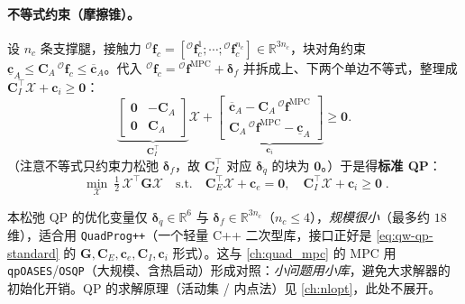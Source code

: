\paragraph{不等式约束（摩擦锥）。}
设 $n_c$ 条支撑腿，接触力 ${}^{\mathcal{O}}\boldsymbol{f}_c=[{}^{\mathcal{O}}\boldsymbol{f}_c^1;\cdots;{}^{\mathcal{O}}\boldsymbol{f}_c^{n_c}]\in\mathbb{R}^{3n_c}$，块对角约束 $\underline{\boldsymbol{c}}_A\le\boldsymbol{C}_A\,{}^{\mathcal{O}}\boldsymbol{f}_c\le\overline{\boldsymbol{c}}_A$。代入 ${}^{\mathcal{O}}\boldsymbol{f}_c={}^{\mathcal{O}}\boldsymbol{f}^{\mathrm{MPC}}+\boldsymbol{\delta}_f$ 并拆成上、下两个单边不等式，整理成 $\boldsymbol{C}_I^\top\boldsymbol{\mathcal{X}}+\boldsymbol{c}_i\ge\mathbf{0}$\cite{yu2021quadruped}：
\begin{equation}
  \underbrace{\begin{bmatrix}\mathbf{0}&-\boldsymbol{C}_A\\\mathbf{0}&\boldsymbol{C}_A\end{bmatrix}}_{\boldsymbol{C}_I^\top}\boldsymbol{\mathcal{X}}
  +\underbrace{\begin{bmatrix}\overline{\boldsymbol{c}}_A-\boldsymbol{C}_A\,{}^{\mathcal{O}}\boldsymbol{f}^{\mathrm{MPC}}\\\boldsymbol{C}_A\,{}^{\mathcal{O}}\boldsymbol{f}^{\mathrm{MPC}}-\underline{\boldsymbol{c}}_A\end{bmatrix}}_{\boldsymbol{c}_i}\ge\mathbf{0}.
  \label{eq:qw-ineq-std}
\end{equation}
（注意不等式只约束力松弛 $\boldsymbol{\delta}_f$，故 $\boldsymbol{C}_I^\top$ 对应 $\boldsymbol{\delta}_{\ddot{q}}$ 的块为 $\mathbf{0}$。）于是得\textbf{标准 QP}\cite{yu2021quadruped}：
\begin{equation}
  \boxed{\;\min_{\boldsymbol{\mathcal{X}}}\ \tfrac12\,\boldsymbol{\mathcal{X}}^\top\boldsymbol{G}\boldsymbol{\mathcal{X}}
  \quad\text{s.t.}\quad
  \boldsymbol{C}_E^\top\boldsymbol{\mathcal{X}}+\boldsymbol{c}_e=\mathbf{0},\quad
  \boldsymbol{C}_I^\top\boldsymbol{\mathcal{X}}+\boldsymbol{c}_i\ge\mathbf{0}\;}.
  \label{eq:qw-qp-standard}
\end{equation}

\begin{practice}[QuadProg++ 选型]
本松弛 QP 的优化变量仅 $\boldsymbol{\delta}_{\ddot{q}}\in\mathbb{R}^6$ 与 $\boldsymbol{\delta}_f\in\mathbb{R}^{3n_c}$（$n_c\le4$），\emph{规模很小}（最多约 $18$ 维），适合用 \texttt{QuadProg++}（一个轻量 C++ 二次型库，接口正好是 \cref{eq:qw-qp-standard} 的 $\boldsymbol{G},\boldsymbol{C}_E,\boldsymbol{c}_e,\boldsymbol{C}_I,\boldsymbol{c}_i$ 形式）。这与 \cref{ch:quad_mpc} 的 MPC 用 \texttt{qpOASES}/\allowbreak\texttt{OSQP}（大规模、含热启动）形成对照：\emph{小问题用小库}，避免大求解器的初始化开销。QP 的求解原理（活动集 / 内点法）见 \cref{ch:nlopt}，此处不展开。
\end{practice}

